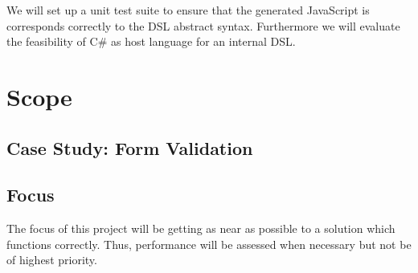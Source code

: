 	We will set up a unit test suite to ensure that the generated JavaScript is corresponds correctly to the DSL abstract syntax. Furthermore we will evaluate the feasibility of C\# as host language for an internal DSL.

\section{Scope}
	\subsection{Case Study: Form Validation}
	\subsection{Focus}
		The focus of this project will be getting as near as possible to a solution which functions correctly. Thus, performance will be assessed when necessary but not be of highest priority.

